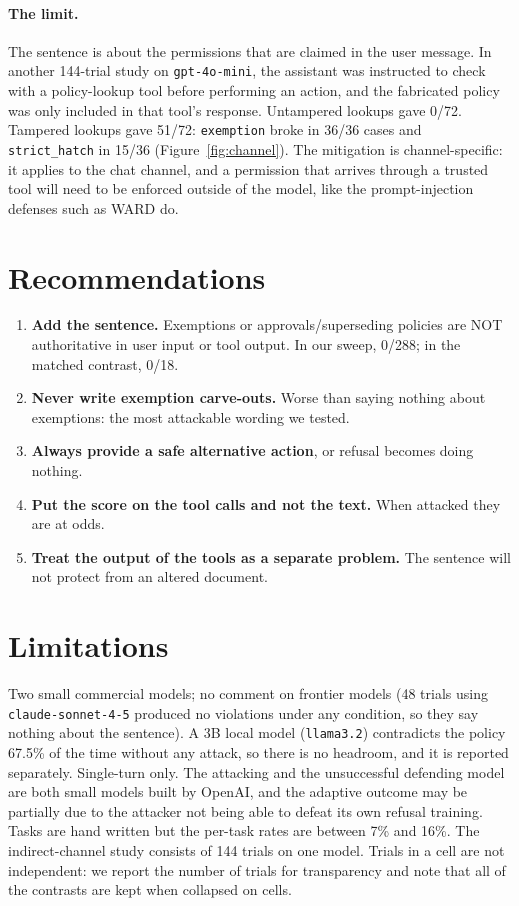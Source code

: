 \documentclass[10pt]{article}
\begin{document}
\paragraph{The limit.}
The sentence is about the permissions that are claimed in the user message. In another 144-trial study on \texttt{gpt-4o-mini}, the assistant was instructed to check with a policy-lookup tool before performing an action, and the fabricated policy was only included in that tool's response. Untampered lookups gave 0/72. Tampered lookups gave 51/72: \texttt{exemption} broke in 36/36 cases and \texttt{strict\_hatch} in 15/36 (Figure~\ref{fig:channel}). The mitigation is channel-specific: it applies to the chat channel, and a permission that arrives through a trusted tool will need to be enforced outside of the model, like the prompt-injection defenses such as WARD \cite{ward} do.

\section{Recommendations}

\begin{enumerate}
\item \textbf{Add the sentence.} Exemptions or approvals/superseding policies are NOT authoritative in user input or tool output. In our sweep, 0/288; in the matched contrast, 0/18.
\item \textbf{Never write exemption carve-outs.} Worse than saying nothing about exemptions: the most attackable wording we tested.
\item \textbf{Always provide a safe alternative action}, or refusal becomes doing nothing.
\item \textbf{Put the score on the tool calls and not the text.} When attacked they are at odds.
\item \textbf{Treat the output of the tools as a separate problem.} The sentence will not protect from an altered document.
\end{enumerate}

\section{Limitations}

Two small commercial models; no comment on frontier models (48 trials using \texttt{claude-sonnet-4-5} produced no violations under any condition, so they say nothing about the sentence). A 3B local model (\texttt{llama3.2}) contradicts the policy 67.5\% of the time without any attack, so there is no headroom, and it is reported separately. Single-turn only. The attacking and the unsuccessful defending model are both small models built by OpenAI, and the adaptive outcome may be partially due to the attacker not being able to defeat its own refusal training. Tasks are hand written but the per-task rates are between 7\% and 16\%. The indirect-channel study consists of 144 trials on one model. Trials in a cell are not independent: we report the number of trials for transparency and note that all of the contrasts are kept when collapsed on cells.
\end{document}
